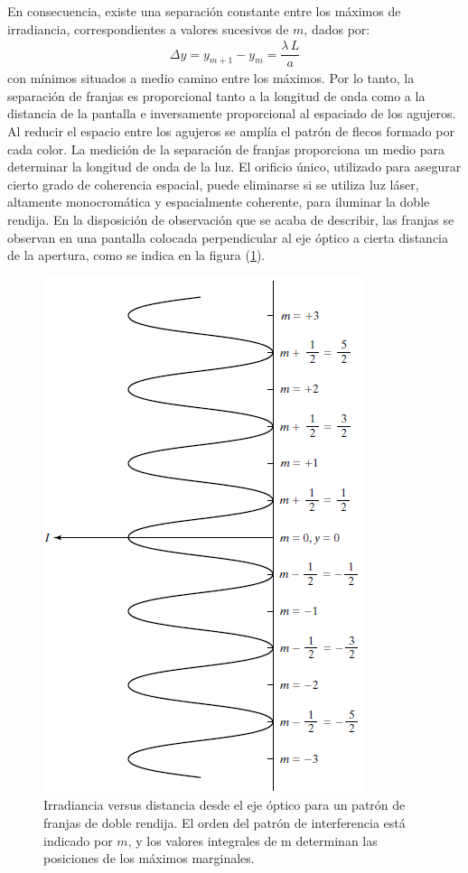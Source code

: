 \documentclass[14pt]{extarticle}
\begin{document}
En consecuencia, existe una separación constante entre los máximos de irradiancia, correspondientes a valores sucesivos de $m$, dados por:
\begin{align}
\Delta  y = y_{m+1} - y_{m} = \dfrac{\lambda \, L}{a}
\label{eq:ecuacion_07_23}
\end{align}
con mínimos situados a medio camino entre los máximos. Por lo tanto, la separación de franjas es proporcional tanto a la longitud de onda como a la distancia de la pantalla e inversamente proporcional al espaciado de los agujeros. Al reducir el espacio entre los agujeros se amplía el patrón de flecos formado por cada color. La medición de la separación de franjas proporciona un medio para determinar la longitud de onda de la luz. El orificio único, utilizado para asegurar cierto grado de coherencia espacial, puede eliminarse si se utiliza luz láser, altamente monocromática y espacialmente coherente, para iluminar la doble rendija. En la disposición de observación que se acaba de describir, las franjas se observan en una pantalla colocada perpendicular al eje óptico a cierta distancia de la apertura, como se indica en la figura (\ref{fig:figura_07_04}).
\begin{figure}[H]
    \centering
    \includegraphics[scale=0.8]{Imagenes/Interferencia2_04.png}
    \caption{Irradiancia versus distancia desde el eje óptico para un patrón de franjas de doble rendija. El orden del patrón de interferencia está indicado por $m$, y los valores integrales de m determinan las posiciones de los máximos marginales.}
    \label{fig:figura_07_04}
\end{figure}
\end{document}
